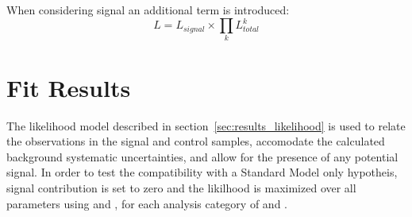 When considering signal an additional term is introduced:
% 
\begin{equation}
L = L_{signal} \times \prod_k L^k_{total}
\label{eq:total_likelihood_wsignal}
\end{equation}
% 







\section{Fit Results}  %
\label{sec:results_fit}
The likelihood model described in section~\ref{sec:results_likelihood} is used
to relate the observations in the signal and control samples, accomodate the
calculated background systematic uncertainties, and allow for the presence of
any potential signal. In order to test the compatibility with a Standard
Model only hypotheis, signal contribution is set to zero and the likilhood is
maximized over all parameters using \ROOFIT \cite{roofit} and \MINUIT
\cite{James:1975dr}, for each analysis category of \nb and \nj.


